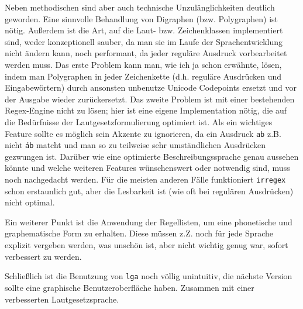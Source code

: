 \documentclass[12pt,a4paper,normalheadings]{scrartcl}
\def\tt#1{\texttt{#1}}
\begin{document}
Neben methodischen sind aber auch technische Unzulänglichkeiten deutlich geworden.
Eine sinnvolle Behandlung von Digraphen (bzw. Polygraphen) ist nötig.
Außerdem ist die Art, auf die Laut- bzw. Zeichenklassen implementiert sind,
weder konzeptionell sauber,
da man sie im Laufe der Sprachentwicklung nicht ändern kann,
noch performant, da jeder reguläre Ausdruck vorbearbeitet werden muss.
Das erste Problem kann man, wie ich ja schon erwähnte, lösen,
indem man Polygraphen in jeder Zeichenkette
(d.h. reguläre Ausdrücken und Eingabewörtern) durch ansonsten unbenutze
Unicode Codepoints ersetzt und vor der Ausgabe wieder zurückersetzt.
Das zweite Problem ist mit einer bestehenden Regex-Engine nicht zu lösen;
hier ist eine eigene Implementation nötig,
die auf die Bedürfnisse der Lautgesetzformulierung optimiert ist.
Als ein wichtiges Feature sollte es möglich sein Akzente zu ignorieren,
da ein Ausdruck \tt{ab} z.B. nicht \tt{áb} matcht und man so zu
teilweise sehr umständlichen Ausdrücken gezwungen ist.
Darüber wie eine optimierte Beschreibungssprache genau aussehen könnte
und welche weiteren Features wünschenswert oder notwendig sind,
muss noch nachgedacht werden.
Für die meisten anderen Fälle funktioniert \tt{irregex} schon erstaunlich gut,
aber die Lesbarkeit ist (wie oft bei regulären Ausdrücken) nicht optimal.

Ein weiterer Punkt ist die Anwendung der Regellisten,
um eine phonetische und graphematische Form zu erhalten.
Diese müssen z.Z. noch für jede Sprache explizit vergeben werden,
was unschön ist, aber nicht wichtig genug war,
sofort verbessert zu werden.

Schließlich ist die Benutzung von \tt{lga} noch völlig unintuitiv,
die nächste Version sollte eine graphische Benutzeroberfläche haben.
Zusammen mit einer verbesserten Lautgesetzsprache.

\printbibliography
\end{document}
